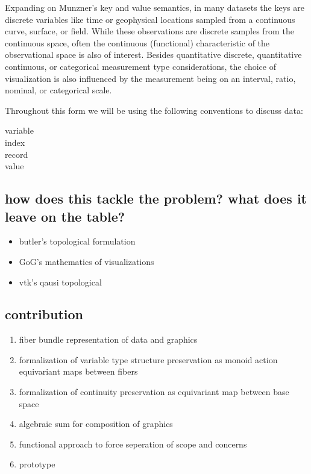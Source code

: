 \documentclass[../main.tex]{subfiles}
\begin{document}
Expanding on Munzner's key and value semantics, in many datasets the keys are discrete variables like time or geophysical locations sampled from a continuous curve, surface, or field. While these observations are discrete samples from the continuous space, often the continuous (functional) characteristic\cite{ramsayFunctionalDataAnalysis2006a,mullerFunctionalVarianceProcesses2006a} of the observational space is also of interest. Besides quantitative discrete, quantitative continuous, or categorical measurement type considerations, the choice of visualization is also influenced by the measurement being on an interval, ratio, nominal, or categorical scale. 

Throughout this form we will be using the following conventions to discuss data:

\begin{description}
    \item[variable]
    \item[index]  
    \item[record]
    \item[value]  
\end{description}

\subsection{how does this tackle the problem? what does it leave on the table?}
\begin{itemize}
    \item butler's topological formulation
    \item GoG's mathematics of visualizations
    \item vtk's qausi topological
\end{itemize}


\subsection{contribution}

\begin{enumerate}
    \item fiber bundle representation of data and graphics
    \item formalization of variable type structure preservation as monoid action equivariant maps between fibers 
    \item formalization of continuity preservation as equivariant map between base space
    \item algebraic sum for composition of graphics
    \item functional approach to force seperation of scope and concerns
    \item prototype  
\end{enumerate}
\end{document}

